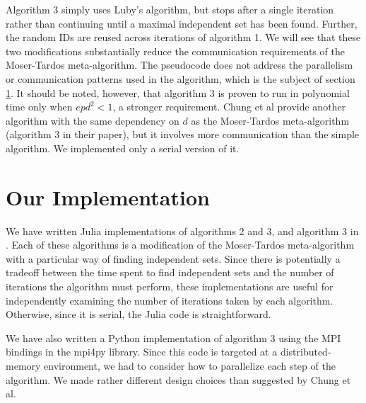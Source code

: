 \documentclass[twocolumn]{article}
\newcommand{\ksat}{\texttt{k-SAT}~}
\begin{document}
Algorithm 3 simply uses Luby's algorithm, but stops after a single iteration rather than continuing until a maximal independent set has been found.  Further, the random IDs are reused across iterations of algorithm 1.  We will see that these two modifications substantially reduce the communication requirements of the Moser-Tardos meta-algorithm.  The pseudocode does not address the parallelism or communication patterns used in the algorithm, which is the subject of section \ref{sec:implementation}.  It should be noted, however, that algorithm 3 is proven to run in polynomial time only when $e p d^2 < 1$, a stronger requirement.  Chung et al provide another algorithm with the same dependency on $d$ as the Moser-Tardos meta-algorithm (algorithm 3 in their paper), but it involves more communication than the simple algorithm.  We implemented only a serial version of it.


\section{Our Implementation}
\label{sec:implementation}
We have written Julia implementations of algorithms 2 and 3, and algorithm 3 in \cite{chung2014distributed}.  Each of these algorithms is a modification of the Moser-Tardos meta-algorithm with a particular way of finding independent sets.  Since there is potentially a tradeoff between the time spent to find independent sets and the number of iterations the algorithm must perform, these implementations are useful for independently examining the number of iterations taken by each algorithm.  Otherwise, since it is serial, the Julia code is straightforward. 

We have also written a Python implementation of algorithm 3 using the MPI bindings in the mpi4py library.  Since this code is targeted at a distributed-memory environment, we had to consider how to parallelize each step of the algorithm.  We made rather different design choices than suggested by Chung et al.
\end{document}
